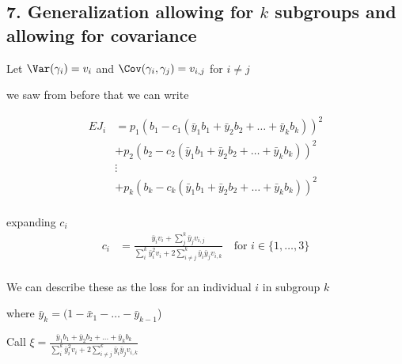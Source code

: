 \subsection*{7. Generalization allowing for $k$ subgroups and allowing for covariance}

Let $\Var(\gamma_i) = v_{i}$ and $\Cov(\gamma_i, \gamma_j) = v_{i,j}$ for $i \neq j$

we saw from before that we can write

\begin{align*}
	E J_i &= p_1 ( b_1 - c_1 (\bar{y}_1 b_1 + \bar{y}_2 b_2 + \ldots + \bar{y}_k b_k ))^2 \\
		  &+ p_2 ( b_2 - c_2 (\bar{y}_1 b_1 +  \bar{y}_2 b_2 + \ldots + \bar{y}_k b_k ))^2 \\
		  &\vdots \\
		  &+ p_k ( b_k - c_k (\bar{y}_1 b_1 +\bar{y}_2 b_2 +  \ldots + \bar{y}_k b_k ))^2 \\
\end{align*}

expanding $c_i$ 
\begin{align*}
	c_i &= \frac{\bar{y}_i v_{i} + \sum_{j}^{k} \bar{y}_j v_{i,j} }{\sum_i^k \bar{y}_i^2 v_i + 2 \sum_{i \neq j}^k \bar{y}_i\bar{y}_j v_{i,k} } \quad \text{for $i \in \{1,\ldots,3\}$} \\
\end{align*}

We can describe these as the loss for an individual $i$ in subgroup $k$ 


where $\bar{y}_k = (1 - \bar{x}_1 - \ldots - \bar{y}_{k-1}$)


Call $\xi = \frac{ \bar{y}_1 b_1 + \bar{y}_2 b_2 + \ldots + \bar{y}_k b_k }{\sum_i^k \bar{y}_i^2 v_i + 2 \sum_{i \neq j}^k \bar{y}_i\bar{y}_j v_{i,k} }$



